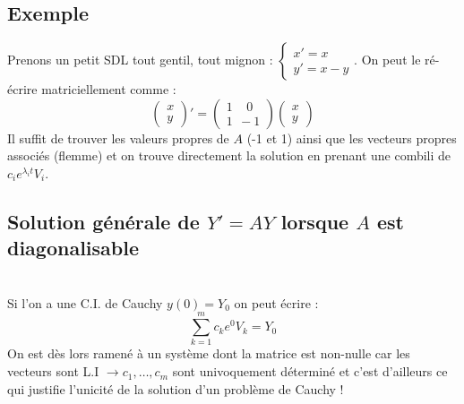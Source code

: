 \documentclass[11pt, a4paper, openany]{book}
\begin{document}
\subsection{Exemple}
Prenons un petit SDL tout gentil, tout mignon : $\left\{\begin{array}{l}
x' = x\\
y' = x-y
\end{array}\right.$. On peut le ré-écrire matriciellement comme :
\begin{equation}
	\left(\begin{array}{l}
	x\\
	y
	\end{array}\right)' = \left(\begin{array}{l}
	1\ \ \  \ \ 0\\
	1\ \ -1
	\end{array}\right)\left(\begin{array}{l}
	x\\
	y
	\end{array}\right)
\end{equation}
Il suffit de trouver les valeurs propres de $A$ (-1 et 1) ainsi que les vecteurs propres associés (flemme) et on trouve directement la solution en prenant une combili de $c_ie^{\lambda_i t}V_i$.
		
\subsection{Solution générale de $Y' = AY$ lorsque $A$ est diagonalisable}
\ \\
		
Si l'on a une C.I. de Cauchy $y(0) = Y_0$ on peut écrire :
\begin{equation}
	\sum_{k=1}^m c_k e^0 V_k = Y_0
\end{equation}
On est dès lors ramené à un système dont la matrice est non-nulle car les vecteurs sont L.I $\rightarrow c_1, \dots,c_m$ sont univoquement déterminé et c'est d'ailleurs ce qui justifie l'unicité de la solution d'un problème de Cauchy !\\
		
\end{document}
